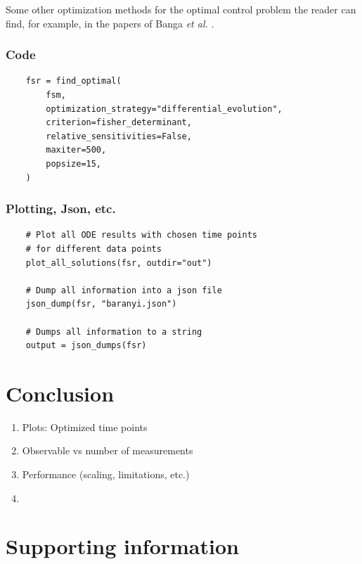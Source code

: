 \documentclass[10pt,A4paper]{article}
\newcommand{\etal}{{\textit{et al. }}}
\begin{document}
Some other optimization methods for the optimal control problem the reader can find, for example, in the papers of Banga \etal \cite{BANGA2005407, BANGA2003131}.
%
\subsubsection*{Code}

\begin{verbatim}
    fsr = find_optimal(
        fsm,
        optimization_strategy="differential_evolution",
        criterion=fisher_determinant,
        relative_sensitivities=False,
        maxiter=500,
        popsize=15,
    )
\end{verbatim}
%
\subsubsection*{Plotting, Json, etc.}
\begin{verbatim}
    # Plot all ODE results with chosen time points
    # for different data points
    plot_all_solutions(fsr, outdir="out")

    # Dump all information into a json file
    json_dump(fsr, "baranyi.json")

    # Dumps all information to a string
    output = json_dumps(fsr)
\end{verbatim}
%
%
%
\section*{Conclusion}
\begin{enumerate}
    \item Plots: Optimized time points
    \item Observable vs number of measurements
    \item Performance (scaling, limitations, etc.)
    \item 
\end{enumerate}
%
%
%
\section*{Supporting information}
%
%
%
\nolinenumbers

\end{document}
